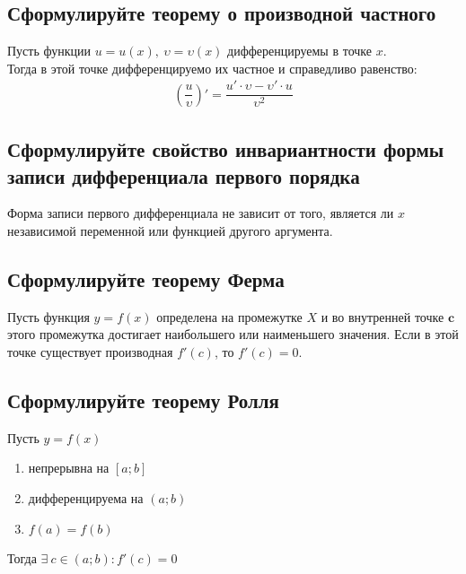 \subsection{Сформулируйте теорему о производной частного}
\begin{theorem}
Пусть функции $u = u(x),\ \upsilon = \upsilon (x)$ дифференцируемы в точке $x$.\\
Тогда в этой точке дифференцируемо их частное и справедливо равенство:
\begin{gather*}
\left(\dfrac{u}{\upsilon}\right)' = \dfrac{u' \cdot \upsilon - \upsilon' \cdot u}{\upsilon^2}
\end{gather*}
\end{theorem}

\subsection{Сформулируйте свойство инвариантности формы записи дифференциала первого порядка}
\begin{theorem}
Форма записи первого дифференциала не зависит от того, является ли $x$ независимой переменной или функцией другого аргумента.
\end{theorem}

\newpage
\subsection{Сформулируйте теорему Ферма}
\begin{theorem}
Пусть функция $y=f(x)$ определена на промежутке $X$ и во внутренней точке $\bm{c}$ этого промежутка достигает наибольшего или наименьшего значения. Если в этой точке существует производная $f'(c)$, то $f'(c) = 0$. 
\end{theorem}

\subsection{Сформулируйте теорему Ролля}
\begin{theorem}
Пусть $y=f(x)$
\begin{enumerate}
\item непрерывна на $[a;b]$
\item дифференцируема на $(a;b)$
\item $f(a) = f(b)$
\end{enumerate}
Тогда $\exists\ c \in (a;b)\colon f'(c) = 0$
\end{theorem}

